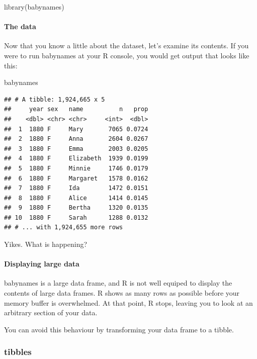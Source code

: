 \documentclass[
]{article}
\newenvironment{Shaded}{\begin{snugshade}}{\end{snugshade}}
\newcommand{\FunctionTok}[1]{\textcolor[rgb]{0.00,0.00,0.00}{#1}}
\newcommand{\NormalTok}[1]{#1}
\begin{document}
\begin{Shaded}
\begin{Highlighting}[]
\FunctionTok{library}\NormalTok{(babynames)}
\end{Highlighting}
\end{Shaded}

\hypertarget{the-data}{%
\paragraph{The data}\label{the-data}}

Now that you know a little about the dataset, let's examine its
contents. If you were to run babynames at your R console, you would get
output that looks like this:

\begin{Shaded}
\begin{Highlighting}[]
\NormalTok{babynames}
\end{Highlighting}
\end{Shaded}

\begin{verbatim}
## # A tibble: 1,924,665 x 5
##     year sex   name          n   prop
##    <dbl> <chr> <chr>     <int>  <dbl>
##  1  1880 F     Mary       7065 0.0724
##  2  1880 F     Anna       2604 0.0267
##  3  1880 F     Emma       2003 0.0205
##  4  1880 F     Elizabeth  1939 0.0199
##  5  1880 F     Minnie     1746 0.0179
##  6  1880 F     Margaret   1578 0.0162
##  7  1880 F     Ida        1472 0.0151
##  8  1880 F     Alice      1414 0.0145
##  9  1880 F     Bertha     1320 0.0135
## 10  1880 F     Sarah      1288 0.0132
## # ... with 1,924,655 more rows
\end{verbatim}

Yikes. What is happening?

\hypertarget{displaying-large-data}{%
\paragraph{Displaying large data}\label{displaying-large-data}}

babynames is a large data frame, and R is not well equiped to display
the contents of large data frames. R shows as many rows as possible
before your memory buffer is overwhelmed. At that point, R stops,
leaving you to look at an arbitrary section of your data.

You can avoid this behaviour by transforming your data frame to a
tibble.

\hypertarget{tibbles}{%
\subsubsection{tibbles}\label{tibbles}}
\end{document}
